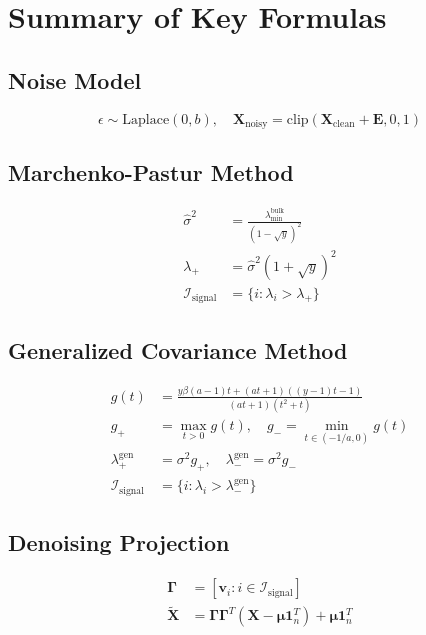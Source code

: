 \documentclass[12pt,a4paper]{article}
\begin{document}
\section{Summary of Key Formulas}

\subsection{Noise Model}
\begin{equation}
\epsilon \sim \text{Laplace}(0, b), \quad \mathbf{X}_{\text{noisy}} = \text{clip}(\mathbf{X}_{\text{clean}} + \mathbf{E}, 0, 1)
\end{equation}

\subsection{Marchenko-Pastur Method}
\begin{align}
\hat{\sigma}^2 &= \frac{\lambda_{\min}^{\text{bulk}}}{(1-\sqrt{y})^2} \\
\lambda_+ &= \hat{\sigma}^2(1+\sqrt{y})^2 \\
\mathcal{I}_{\text{signal}} &= \{i : \lambda_i > \lambda_+\}
\end{align}

\subsection{Generalized Covariance Method}
\begin{align}
g(t) &= \frac{y\beta(a-1)t + (at+1)((y-1)t-1)}{(at+1)(t^2+t)} \\
g_+ &= \max_{t>0} g(t), \quad g_- = \min_{t \in (-1/a,0)} g(t) \\
\lambda_+^{\text{gen}} &= \sigma^2 g_+, \quad \lambda_-^{\text{gen}} = \sigma^2 g_- \\
\mathcal{I}_{\text{signal}} &= \{i : \lambda_i > \lambda_-^{\text{gen}}\}
\end{align}

\subsection{Denoising Projection}
\begin{align}
\mathbf{\Gamma} &= [\mathbf{v}_i : i \in \mathcal{I}_{\text{signal}}] \\
\tilde{\mathbf{X}} &= \mathbf{\Gamma}\mathbf{\Gamma}^T (\mathbf{X} - \boldsymbol{\mu}\mathbf{1}_n^T) + \boldsymbol{\mu}\mathbf{1}_n^T
\end{align}
\end{document}
